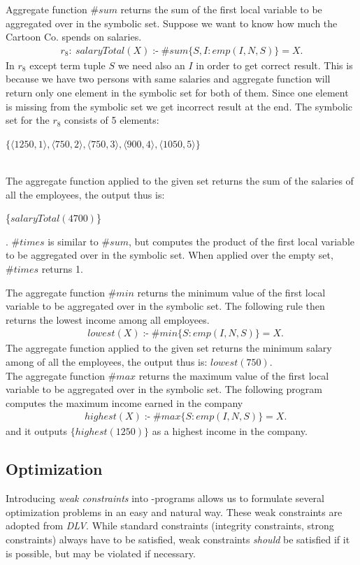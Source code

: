 \documentclass[a4paper, titlepage]{article}
\DeclareMathOperator{\leftimpl}{:-}
\begin{document}
Aggregate function $\mathit{\#sum}$ returns the 
sum of the first local variable to be aggregated over in 
the symbolic set. Suppose we want to know how much the 
Cartoon Co. spends on salaries.
\begin{align*}
\mathit{r_8 \colon \ salaryTotal(X)} \leftimpl \mathit{\#sum}\{S,I : 
\mathit{emp(I,N,S)}\} = X.
\end{align*}
In $r_8$ except term tuple $S$ we need also an $I$ in order to get correct result. This is because we have two persons with same salaries and aggregate function will return only one element in the symbolic set for both of them. Since one element is missing from the symbolic set we get incorrect result at the end.  
The symbolic set for the $r_8$ consists of 5 elements:\\ 
\centerline{$\{ \langle 1250,1 \rangle, \langle 750,2 \rangle, \langle 750,3 \rangle, \langle 900,4 \rangle, \langle 1050,5 \rangle\}$} 
\\The 
aggregate function applied to the given set returns the sum 
of the salaries of all the employees, the output thus is: 
\\ \centerline{
\{$\mathit{salaryTotal(4700)}$\}}. $\mathit{\#times}$ is 
similar to $\mathit{\#sum}$, but computes the product of 
the first local variable to be aggregated over in the 
symbolic set. When applied over the empty set, 
$\mathit{\#times}$ returns 1.

The aggregate function $\mathit{\#min}$ returns 
the minimum value of the first local variable to be 
aggregated over in the symbolic set. The following rule then returns the lowest income among all employees.
\begin{align*}
& lowest(X) \leftimpl \#min\{S : emp(I,N,S)\} = X.
\end{align*}
The aggregate function applied to the given set returns the 
minimum salary among of all the employees, the output thus 
is:
{$\mathit{lowest(750)}$}.
\bigskip \\The aggregate function $\mathit{\#max}$ returns 
the maximum value of the first local variable to be 
aggregated over in the symbolic set. The following program 
computes the maximum income earned in the company
\begin{align*}
& \mathit{highest}(X) \leftimpl \mathit{\#max}\{S : 
\mathit{emp}(I,N,S)\} = X.
\end{align*}
and it outputs $\{highest(1250)\}$ as a highest income in 
the company.

\subsection{Optimization}
\label{optimize}
Introducing \emph{weak constraints} into \hex-programs 
allows us to formulate several optimization problems in an 
easy and natural way. These weak constraints are adopted 
from \emph{DLV}. While standard constraints (integrity 
constraints, strong constraints) always have to be 
satisfied, weak constraints \emph{should} be satisfied if it is 
possible, but may be violated if necessary.
\end{document}

